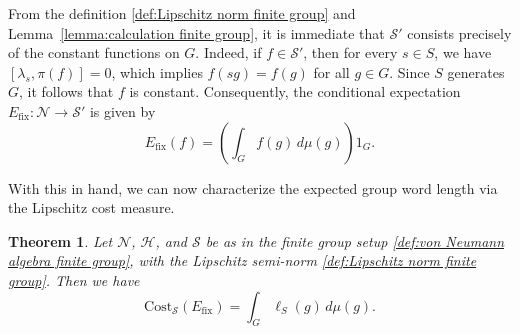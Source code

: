 \documentclass[11pt,reqno]{amsart}
\numberwithin{equation}{section}
\newtheorem{theorem}[lemma]{Theorem}
\newcommand{\mc}{\mathcal}
\newcommand{\Cost}{\mathrm{Cost}}
\newcommand{\fix}{\mathrm{fix}}
\begin{document}
From the definition \eqref{def:Lipschitz norm finite group} and Lemma~\ref{lemma:calculation finite group}, it is immediate that $\mc S'$ consists precisely of the constant functions on $G$. Indeed, if $f \in \mc S'$, then for every $s \in S$, we have $[\lambda_s, \pi(f)] = 0$, which implies $f(sg)=f(g)$ for all $g \in G$. Since $S$ generates $G$, it follows that $f$ is constant. Consequently, the conditional expectation $E_{\fix}: \mc N \to \mc S'$ is given by
\begin{equation}\label{def:conditional_expectation_finite_group}
    E_{\fix}(f) = \left(\int_G f(g) \, d\mu(g)\right) 1_G.
\end{equation}

With this in hand, we can now characterize the expected group word length via the Lipschitz cost measure.

\begin{theorem}\label{thm:expected_length}
    Let $\mc N$, $\mc H$, and $\mc S$ be as in the finite group setup \eqref{def:von Neumann algebra finite group}, with the Lipschitz semi-norm \eqref{def:Lipschitz norm finite group}. Then we have
    \[
        \Cost_{\mc S}(E_{\fix})= \int_G \ell_{S}(g)\, d\mu(g).
    \]
\end{theorem}
\end{document}
